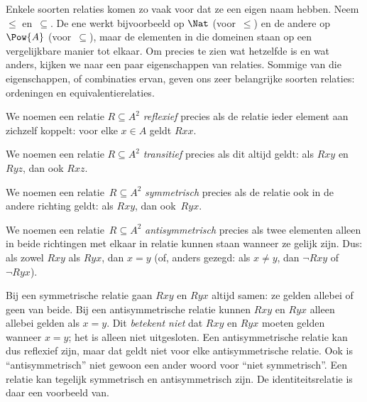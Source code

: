 \documentclass[../../../include/open-logic-section]{subfiles}
\begin{document}

\begin{intro}
Enkele soorten relaties komen zo vaak voor dat ze een eigen naam
hebben. Neem $\le$ en~$\subseteq$. De ene werkt bijvoorbeeld op $\Nat$
(voor~$\le$) en de andere op $\Pow{A}$ (voor~$\subseteq$), maar de
elementen in die domeinen staan op een vergelijkbare manier tot elkaar.
Om precies te zien wat hetzelfde is en wat anders, kijken we naar een
paar eigenschappen van relaties.
Sommige van die eigenschappen, of combinaties ervan, geven ons zeer
belangrijke soorten relaties: ordeningen en equivalentierelaties.
\end{intro}

\begin{defn}[Reflexiviteit]
We noemen een relatie $R \subseteq A^2$ \emph{reflexief} precies als
de relatie ieder element aan zichzelf koppelt: voor elke
$x \in A$ geldt $Rxx$.
\end{defn}

\begin{defn}[Transitiviteit]
We noemen een relatie $R \subseteq A^2$ \emph{transitief} precies als
dit altijd geldt: als $Rxy$ en $Ryz$, dan ook $Rxz$.
\end{defn}

\begin{defn}[Symmetrie]
We noemen een relatie~$R \subseteq A^2$ \emph{symmetrisch} precies als
de relatie ook in de andere richting geldt: als $Rxy$, dan ook~$Ryx$.
\end{defn}

\begin{defn}[Antisymmetrie]
We noemen een relatie~$R \subseteq A^2$ \emph{an\-ti\-symmetrisch}
precies als twee elementen alleen in beide richtingen met elkaar in
relatie kunnen staan wanneer ze gelijk zijn. Dus: als zowel $Rxy$ als
$Ryx$, dan $x=y$ (of, anders gezegd: als $x\neq y$, dan $\lnot Rxy$ of
$\lnot Ryx$).
\end{defn}

\begin{explain}
Bij een symmetrische relatie gaan $Rxy$ en $Ryx$ altijd samen: ze
gelden allebei of geen van beide. Bij een antisymmetrische relatie
kunnen $Rxy$ en $Ryx$ alleen allebei gelden als $x = y$. Dit \emph{betekent niet}
dat $Rxy$ en $Ryx$ moeten gelden wanneer $x = y$; het is alleen niet
uitgesloten. Een antisymmetrische relatie kan dus reflexief zijn, maar
dat geldt niet voor elke antisymmetrische relatie. Ook is
``antisymmetrisch'' niet gewoon een ander woord voor ``niet
symmetrisch''. Een relatie kan tegelijk symmetrisch en
antisymmetrisch zijn. De identiteitsrelatie is daar een voorbeeld van.
\end{explain}
\end{document}
